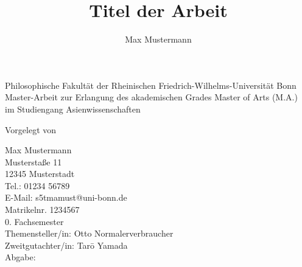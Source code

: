 \renewcommand{\maketitle}{
	\begin{center}
		
		\pagestyle{empty}
		{\LARGE Philosophische Fakultät der Rheinischen Friedrich-Wilhelms-Universität Bonn}
		\vfill
		{Master-Arbeit zur Erlangung des akademischen Grades Master of Arts (M.A.) \\
		im Studiengang Asienwissenschaften}\\ 
		\vspace{3cm}
		{\LARGE \@title\par}
		\vfill
		\begin{singlespace}
		Vorgelegt von\\
		\begin{flushleft}
		Max Mustermann\\
		Musterstaße 11\\
		12345 Musterstadt\\
		Tel.: 01234 56789\\
		E-Mail: s5tmamust@uni-bonn.de\\
		Matrikelnr. 1234567\\
		0. Fachsemester\\
	    \vspace{36pt}
	    Themensteller/in: Otto Normalerverbraucher\\
        Zweitgutachter/in: Tarō Yamada  \\
		Abgabe: \@date
		\end{flushleft}
		\end{singlespace}
	\end{center}
}
\makeatother
\newcommand{\mytitle}{Titel der Arbeit}


\begin{titlepage}%
\author{Max Mustermann}
\setlength\parindent{24pt} %
\title{\rmfamily \mytitle}
\maketitle
\end{titlepage}
